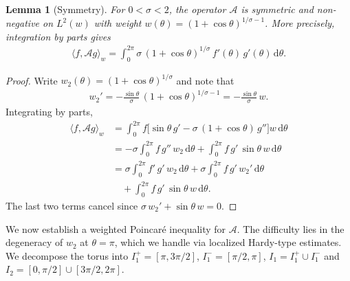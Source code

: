 \documentclass[a4paper, 11pt]{article}
\newtheorem{lemma}{Lemma}
\begin{document}
\begin{lemma}[Symmetry]\label{lem:symmetry}
For $0 < \sigma < 2$, the operator $\mathcal{A}$ is symmetric and non-negative on $L^2(w)$ with weight $w(\theta) = (1+\cos\theta)^{1/\sigma - 1}$. More precisely, integration by parts gives
\begin{align}
    \langle f, \mathcal{A} g \rangle_w = \int_0^{2\pi} \sigma\,(1+\cos\theta)^{1/\sigma}\, f'(\theta)\, g'(\theta)\, \mathrm{d}\theta.
\end{align}
\end{lemma}
\begin{proof}
Write $w_2(\theta) = (1+\cos\theta)^{1/\sigma}$ and note that
\begin{align}
    w_2' = -\frac{\sin\theta}{\sigma}\,(1+\cos\theta)^{1/\sigma - 1} = -\frac{\sin\theta}{\sigma}\, w.
\end{align}
Integrating by parts,
\begin{align}
    \langle f, \mathcal{A} g \rangle_w &= \int_0^{2\pi} f\big[\sin\theta\, g' - \sigma\,(1+\cos\theta)\, g''\big] w\, \mathrm{d}\theta \nonumber\\
    &= -\sigma \int_0^{2\pi} f\, g''\, w_2\, \mathrm{d}\theta + \int_0^{2\pi} f\, g'\, \sin\theta\, w\, \mathrm{d}\theta \nonumber\\
    &= \sigma \int_0^{2\pi} f'\, g'\, w_2\, \mathrm{d}\theta + \sigma\int_0^{2\pi} f\, g'\, w_2'\, \mathrm{d}\theta \nonumber\\
    &\quad + \int_0^{2\pi} f\, g'\, \sin\theta\, w\, \mathrm{d}\theta.
\end{align}
The last two terms cancel since $\sigma\, w_2' + \sin\theta\, w = 0$.
\end{proof}

We now establish a weighted Poincar\'{e} inequality for $\mathcal{A}$. The difficulty lies in the degeneracy of $w_2$ at $\theta = \pi$, which we handle via localized Hardy-type estimates. We decompose the torus into $I_1^+ = [\pi, 3\pi/2]$, $I_1^- = [\pi/2, \pi]$, $I_1 = I_1^+ \cup I_1^-$ and $I_2 = [0,\pi/2] \cup [3\pi/2, 2\pi]$.
\end{document}
